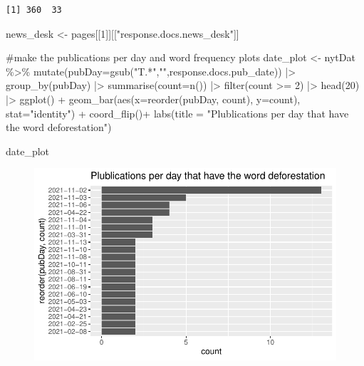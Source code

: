 \documentclass[
  letterpaper,
  DIV=11,
  numbers=noendperiod]{scrartcl}
\newenvironment{Shaded}{\begin{snugshade}}{\end{snugshade}}
\newcommand{\AttributeTok}[1]{\textcolor[rgb]{0.40,0.45,0.13}{#1}}
\newcommand{\CommentTok}[1]{\textcolor[rgb]{0.37,0.37,0.37}{#1}}
\newcommand{\DecValTok}[1]{\textcolor[rgb]{0.68,0.00,0.00}{#1}}
\newcommand{\FunctionTok}[1]{\textcolor[rgb]{0.28,0.35,0.67}{#1}}
\newcommand{\NormalTok}[1]{\textcolor[rgb]{0.00,0.23,0.31}{#1}}
\newcommand{\OtherTok}[1]{\textcolor[rgb]{0.00,0.23,0.31}{#1}}
\newcommand{\SpecialCharTok}[1]{\textcolor[rgb]{0.37,0.37,0.37}{#1}}
\newcommand{\StringTok}[1]{\textcolor[rgb]{0.13,0.47,0.30}{#1}}
\begin{document}
\begin{verbatim}
[1] 360  33
\end{verbatim}

\begin{Shaded}
\begin{Highlighting}[]
\NormalTok{news\_desk }\OtherTok{\textless{}{-}}\NormalTok{ pages[[}\DecValTok{1}\NormalTok{]][[}\StringTok{"response.docs.news\_desk"}\NormalTok{]]}
\end{Highlighting}
\end{Shaded}

\begin{Shaded}
\begin{Highlighting}[]
\CommentTok{\#make the publications per day and word frequency plots}
\NormalTok{date\_plot }\OtherTok{\textless{}{-}}\NormalTok{ nytDat }\SpecialCharTok{\%\textgreater{}\%}
  \FunctionTok{mutate}\NormalTok{(}\AttributeTok{pubDay=}\FunctionTok{gsub}\NormalTok{(}\StringTok{"T.*"}\NormalTok{,}\StringTok{""}\NormalTok{,response.docs.pub\_date)) }\SpecialCharTok{|\textgreater{}}
  \FunctionTok{group\_by}\NormalTok{(pubDay) }\SpecialCharTok{|\textgreater{}}
  \FunctionTok{summarise}\NormalTok{(}\AttributeTok{count=}\FunctionTok{n}\NormalTok{()) }\SpecialCharTok{|\textgreater{}}
  \FunctionTok{filter}\NormalTok{(count }\SpecialCharTok{\textgreater{}=} \DecValTok{2}\NormalTok{) }\SpecialCharTok{|\textgreater{}}
   \FunctionTok{head}\NormalTok{(}\DecValTok{20}\NormalTok{) }\SpecialCharTok{|\textgreater{}}
  \FunctionTok{ggplot}\NormalTok{() }\SpecialCharTok{+}
  \FunctionTok{geom\_bar}\NormalTok{(}\FunctionTok{aes}\NormalTok{(}\AttributeTok{x=}\FunctionTok{reorder}\NormalTok{(pubDay, count), }\AttributeTok{y=}\NormalTok{count), }\AttributeTok{stat=}\StringTok{"identity"}\NormalTok{) }\SpecialCharTok{+}
  \FunctionTok{coord\_flip}\NormalTok{()}\SpecialCharTok{+}
  \FunctionTok{labs}\NormalTok{(}\AttributeTok{title =} \StringTok{"Plublications per day that have the word deforestation"}\NormalTok{)}
  
\NormalTok{date\_plot}
\end{Highlighting}
\end{Shaded}

\begin{figure}[H]

{\centering \includegraphics{lab1_Ayala_files/figure-pdf/unnamed-chunk-5-1.pdf}

}

\end{figure}
\end{document}
